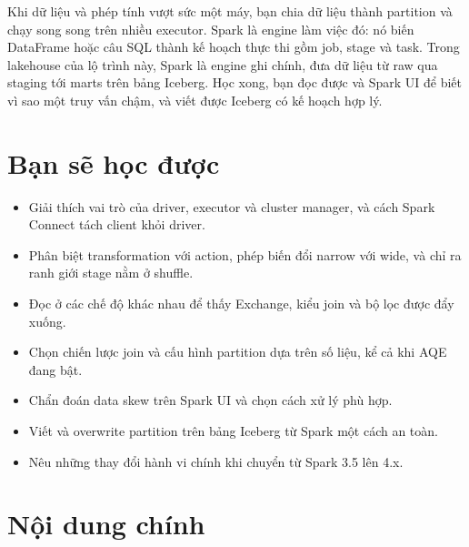 
Khi dữ liệu và phép tính vượt sức một máy, bạn chia dữ liệu thành partition và chạy song song trên nhiều executor. Spark là engine làm việc đó: nó biến DataFrame hoặc câu SQL thành kế hoạch thực thi gồm job, stage và task. Trong lakehouse của lộ trình này, Spark là engine ghi chính, đưa dữ liệu từ raw qua staging tới marts trên bảng Iceberg. Học xong, bạn đọc được  và Spark UI để biết vì sao một truy vấn chậm, và viết được  Iceberg có kế hoạch hợp lý.

\section{Bạn sẽ học được}
\begin{itemize}
  \item Giải thích vai trò của driver, executor và cluster manager, và cách Spark Connect tách client khỏi driver.
  \item Phân biệt transformation với action, phép biến đổi narrow với wide, và chỉ ra ranh giới stage nằm ở shuffle.
  \item Đọc  ở các chế độ khác nhau để thấy Exchange, kiểu join và bộ lọc được đẩy xuống.
  \item Chọn chiến lược join và cấu hình partition dựa trên số liệu, kể cả khi AQE đang bật.
  \item Chẩn đoán data skew trên Spark UI và chọn cách xử lý phù hợp.
  \item Viết  và overwrite partition trên bảng Iceberg từ Spark một cách an toàn.
  \item Nêu những thay đổi hành vi chính khi chuyển từ Spark 3.5 lên 4.x.
\end{itemize}

\section{Nội dung chính}

